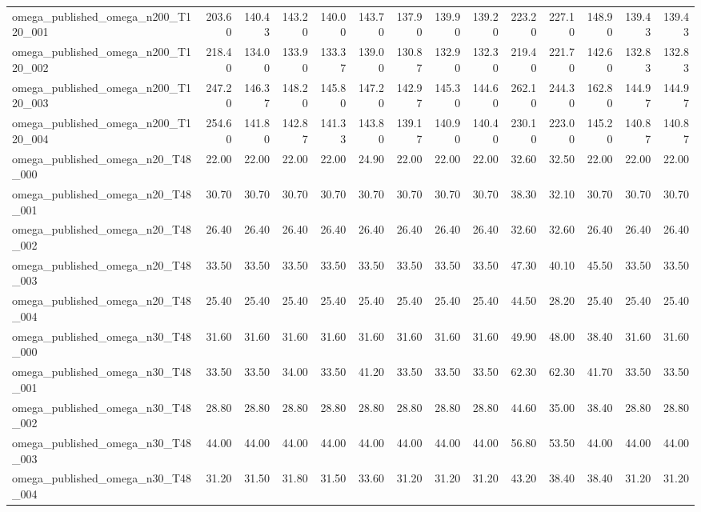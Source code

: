\begin{table}[htbp]
\begin{tabular}{lrrrrrrrrrrrrr}
omega\_published\_omega\_n200\_T120\_001 & 203.60 & 140.43 & 143.20 & 140.00 & 143.70 & 137.90 & 139.90 & 139.20 & 223.20 & 227.10 & 148.90 & 139.43 & 139.43 \\
omega\_published\_omega\_n200\_T120\_002 & 218.40 & 134.00 & 133.90 & 133.37 & 139.00 & 130.87 & 132.90 & 132.30 & 219.40 & 221.70 & 142.60 & 132.83 & 132.83 \\
omega\_published\_omega\_n200\_T120\_003 & 247.20 & 146.37 & 148.20 & 145.80 & 147.20 & 142.97 & 145.30 & 144.60 & 262.10 & 244.30 & 162.80 & 144.97 & 144.97 \\
omega\_published\_omega\_n200\_T120\_004 & 254.60 & 141.80 & 142.87 & 141.33 & 143.80 & 139.17 & 140.90 & 140.40 & 230.10 & 223.00 & 145.20 & 140.87 & 140.87 \\
omega\_published\_omega\_n20\_T48\_000 & 22.00 & 22.00 & 22.00 & 22.00 & 24.90 & 22.00 & 22.00 & 22.00 & 32.60 & 32.50 & 22.00 & 22.00 & 22.00 \\
omega\_published\_omega\_n20\_T48\_001 & 30.70 & 30.70 & 30.70 & 30.70 & 30.70 & 30.70 & 30.70 & 30.70 & 38.30 & 32.10 & 30.70 & 30.70 & 30.70 \\
omega\_published\_omega\_n20\_T48\_002 & 26.40 & 26.40 & 26.40 & 26.40 & 26.40 & 26.40 & 26.40 & 26.40 & 32.60 & 32.60 & 26.40 & 26.40 & 26.40 \\
omega\_published\_omega\_n20\_T48\_003 & 33.50 & 33.50 & 33.50 & 33.50 & 33.50 & 33.50 & 33.50 & 33.50 & 47.30 & 40.10 & 45.50 & 33.50 & 33.50 \\
omega\_published\_omega\_n20\_T48\_004 & 25.40 & 25.40 & 25.40 & 25.40 & 25.40 & 25.40 & 25.40 & 25.40 & 44.50 & 28.20 & 25.40 & 25.40 & 25.40 \\
omega\_published\_omega\_n30\_T48\_000 & 31.60 & 31.60 & 31.60 & 31.60 & 31.60 & 31.60 & 31.60 & 31.60 & 49.90 & 48.00 & 38.40 & 31.60 & 31.60 \\
omega\_published\_omega\_n30\_T48\_001 & 33.50 & 33.50 & 34.00 & 33.50 & 41.20 & 33.50 & 33.50 & 33.50 & 62.30 & 62.30 & 41.70 & 33.50 & 33.50 \\
omega\_published\_omega\_n30\_T48\_002 & 28.80 & 28.80 & 28.80 & 28.80 & 28.80 & 28.80 & 28.80 & 28.80 & 44.60 & 35.00 & 38.40 & 28.80 & 28.80 \\
omega\_published\_omega\_n30\_T48\_003 & 44.00 & 44.00 & 44.00 & 44.00 & 44.00 & 44.00 & 44.00 & 44.00 & 56.80 & 53.50 & 44.00 & 44.00 & 44.00 \\
omega\_published\_omega\_n30\_T48\_004 & 31.20 & 31.50 & 31.80 & 31.50 & 33.60 & 31.20 & 31.20 & 31.20 & 43.20 & 38.40 & 38.40 & 31.20 & 31.20 \\

\end{tabular}
\end{table}

